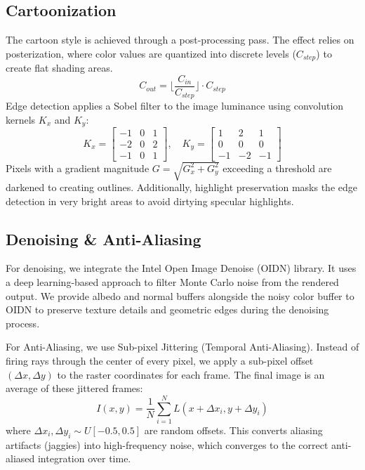 \documentclass[sigconf]{acmart}
\begin{document}
\subsection{Cartoonization}
The cartoon style is achieved through a post-processing pass.
The effect relies on posterization, where color values are quantized into discrete levels ($C_{step}$) to create flat shading areas.
\begin{equation}
C_{out} = \lfloor \frac{C_{in}}{C_{step}} \rfloor \cdot C_{step}
\end{equation}
Edge detection applies a Sobel filter to the image luminance using convolution kernels $K_x$ and $K_y$:
\begin{equation}
K_x = \begin{bmatrix} -1 & 0 & 1 \\ -2 & 0 & 2 \\ -1 & 0 & 1 \end{bmatrix}, \quad K_y = \begin{bmatrix} 1 & 2 & 1 \\ 0 & 0 & 0 \\ -1 & -2 & -1 \end{bmatrix}
\end{equation}
Pixels with a gradient magnitude $G = \sqrt{G_x^2 + G_y^2}$ exceeding a threshold are darkened to creating outlines.
Additionally, highlight preservation masks the edge detection in very bright areas to avoid dirtying specular highlights.

\subsection{Denoising \& Anti-Aliasing}
For denoising, we integrate the Intel Open Image Denoise (OIDN) library. It uses a deep learning-based approach to filter Monte Carlo noise from the rendered output. We provide albedo and normal buffers alongside the noisy color buffer to OIDN to preserve texture details and geometric edges during the denoising process.

For Anti-Aliasing, we use Sub-pixel Jittering (Temporal Anti-Aliasing). Instead of firing rays through the center of every pixel, we apply a sub-pixel offset $(\Delta x, \Delta y)$ to the raster coordinates for each frame. The final image is an average of these jittered frames:
\begin{equation}
I(x, y) = \frac{1}{N} \sum_{i=1}^{N} L(x + \Delta x_i, y + \Delta y_i)
\end{equation}
where $\Delta x_i, \Delta y_i \sim U[-0.5, 0.5]$ are random offsets. This converts aliasing artifacts (jaggies) into high-frequency noise, which converges to the correct anti-aliased integration over time.
\end{document}
